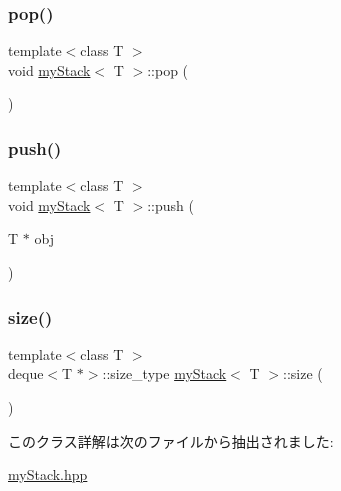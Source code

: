 \mbox{\label{classmy_stack_ac5c13cd1329d85cdb0e9870d24230324}} 
\subsubsection{\texorpdfstring{pop()}{pop()}}
{\footnotesize\ttfamily template$<$class T $>$ \\
void \hyperlink{classmy_stack}{my\+Stack}$<$ T $>$\+::pop (\begin{DoxyParamCaption}{ }\end{DoxyParamCaption})\hspace{0.3cm}{\ttfamily [inline]}}

\mbox{\label{classmy_stack_ab44aa707db5bce9315ed3bc32ccac11e}} 
\subsubsection{\texorpdfstring{push()}{push()}}
{\footnotesize\ttfamily template$<$class T $>$ \\
void \hyperlink{classmy_stack}{my\+Stack}$<$ T $>$\+::push (\begin{DoxyParamCaption}\item[{T $\ast$}]{obj }\end{DoxyParamCaption})\hspace{0.3cm}{\ttfamily [inline]}}

\mbox{\label{classmy_stack_a565111195b278e48d10e12c0e5d0128d}} 
\subsubsection{\texorpdfstring{size()}{size()}}
{\footnotesize\ttfamily template$<$class T $>$ \\
deque$<$T $\ast$$>$\+::size\+\_\+type \hyperlink{classmy_stack}{my\+Stack}$<$ T $>$\+::size (\begin{DoxyParamCaption}{ }\end{DoxyParamCaption})\hspace{0.3cm}{\ttfamily [inline]}}



このクラス詳解は次のファイルから抽出されました\+:\begin{DoxyCompactItemize}
\item 
\hyperlink{my_stack_8hpp}{my\+Stack.\+hpp}\end{DoxyCompactItemize}
